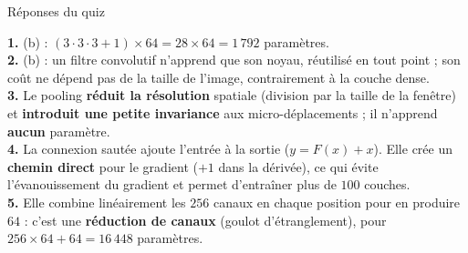 \begin{frame}{Réponses du quiz}
\begin{solbox}
\textbf{1.} (b) : $(3\cdot 3\cdot 3 + 1)\times 64 = 28 \times 64 = 1\,792$
paramètres. \\[1mm]
\textbf{2.} (b) : un filtre convolutif n'apprend que son noyau, réutilisé
en tout point ; son coût ne dépend pas de la taille de l'image, contrairement
à la couche dense. \\[1mm]
\textbf{3.} Le pooling \textbf{ réduit la résolution} spatiale (division par
la taille de la fenêtre) et \textbf{introduit une petite invariance} aux
micro-déplacements ; il n'apprend \textbf{aucun} paramètre. \\[1mm]
\textbf{4.} La connexion sautée ajoute l'entrée à la sortie ($y = F(x)+x$).
Elle crée un \textbf{chemin direct} pour le gradient ($+1$ dans la dérivée),
ce qui évite l'évanouissement du gradient et permet d'entraîner plus de
$100$ couches. \\[1mm]
\textbf{5.} Elle combine linéairement les $256$ canaux en chaque position
pour en produire $64$ : c'est une \textbf{réduction de canaux} (goulot
d'étranglement), pour $256 \times 64 + 64 = 16\,448$ paramètres.
\end{solbox}
\end{frame}

